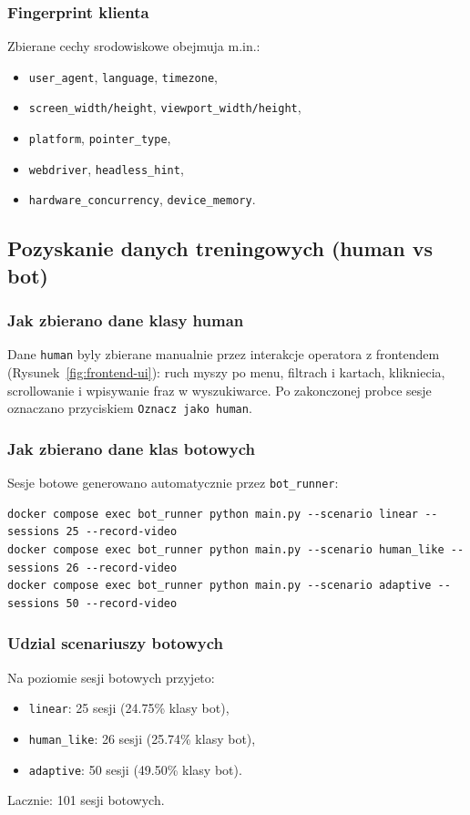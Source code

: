 \subsubsection{Fingerprint klienta}
Zbierane cechy srodowiskowe obejmuja m.in.:
\begin{itemize}
  \item \texttt{user\_agent}, \texttt{language}, \texttt{timezone},
  \item \texttt{screen\_width/height}, \texttt{viewport\_width/height},
  \item \texttt{platform}, \texttt{pointer\_type},
  \item \texttt{webdriver}, \texttt{headless\_hint},
  \item \texttt{hardware\_concurrency}, \texttt{device\_memory}.
\end{itemize}

\subsection{Pozyskanie danych treningowych (human vs bot)}
\subsubsection{Jak zbierano dane klasy human}
Dane \texttt{human} byly zbierane manualnie przez interakcje operatora z frontendem
(Rysunek~\ref{fig:frontend-ui}): ruch myszy po menu, filtrach i kartach,
klikniecia, scrollowanie i wpisywanie fraz w wyszukiwarce.
Po zakonczonej probce sesje oznaczano przyciskiem \texttt{Oznacz jako human}.

\subsubsection{Jak zbierano dane klas botowych}
Sesje botowe generowano automatycznie przez \texttt{bot\_runner}:
\begin{lstlisting}[style=reportcode]
docker compose exec bot_runner python main.py --scenario linear --sessions 25 --record-video
docker compose exec bot_runner python main.py --scenario human_like --sessions 26 --record-video
docker compose exec bot_runner python main.py --scenario adaptive --sessions 50 --record-video
\end{lstlisting}

\subsubsection{Udzial scenariuszy botowych}
Na poziomie sesji botowych przyjeto:
\begin{itemize}
  \item \texttt{linear}: 25 sesji (24.75\% klasy bot),
  \item \texttt{human\_like}: 26 sesji (25.74\% klasy bot),
  \item \texttt{adaptive}: 50 sesji (49.50\% klasy bot).
\end{itemize}
Lacznie: 101 sesji botowych.

